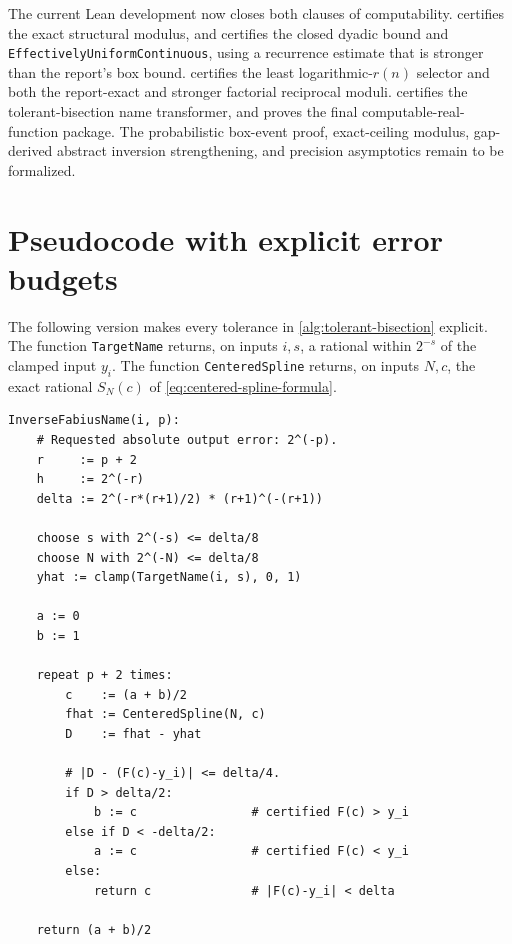 \documentclass[11pt,oneside]{article}
\theoremstyle{definition}
\theoremstyle{remark}
\numberwithin{equation}{section}
\begin{document}
The current Lean development now closes both clauses of computability.
 certifies the exact structural modulus, and
 certifies the closed dyadic bound
and \texttt{EffectivelyUniformContinuous}, using a recurrence estimate that is
stronger than the report's box bound.
 certifies the least
logarithmic-$r(n)$ selector and both the report-exact and stronger factorial
reciprocal moduli.  certifies the
tolerant-bisection name transformer, and
 proves the final
computable-real-function package. The probabilistic box-event proof,
exact-ceiling modulus, gap-derived abstract inversion strengthening, and
precision asymptotics remain to be formalized.

\appendix

\section{Pseudocode with explicit error budgets}
\label{app:pseudocode}

The following version makes every tolerance in
\cref{alg:tolerant-bisection} explicit.  The function
\texttt{TargetName} returns, on inputs $i,s$, a rational within $2^{-s}$ of
the clamped input $y_i$.  The function \texttt{CenteredSpline} returns, on
inputs $N,c$, the exact rational
$S_N(c)$ of \eqref{eq:centered-spline-formula}.

\begin{lstlisting}[style=reportpseudo,language={}]
InverseFabiusName(i, p):
    # Requested absolute output error: 2^(-p).
    r     := p + 2
    h     := 2^(-r)
    delta := 2^(-r*(r+1)/2) * (r+1)^(-(r+1))

    choose s with 2^(-s) <= delta/8
    choose N with 2^(-N) <= delta/8
    yhat := clamp(TargetName(i, s), 0, 1)

    a := 0
    b := 1

    repeat p + 2 times:
        c    := (a + b)/2
        fhat := CenteredSpline(N, c)
        D    := fhat - yhat

        # |D - (F(c)-y_i)| <= delta/4.
        if D > delta/2:
            b := c                # certified F(c) > y_i
        else if D < -delta/2:
            a := c                # certified F(c) < y_i
        else:
            return c              # |F(c)-y_i| < delta

    return (a + b)/2
\end{lstlisting}
\end{document}
